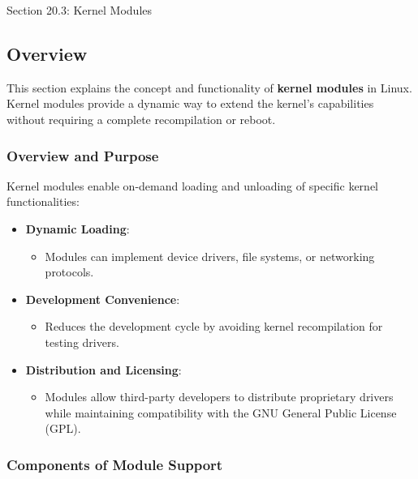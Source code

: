 \begin{notes}{Section 20.3: Kernel Modules}
    \subsection*{Overview}

    This section explains the concept and functionality of \textbf{kernel modules} in Linux. Kernel modules provide a dynamic way to extend the kernel's capabilities without requiring a complete 
    recompilation or reboot.
    
    \subsubsection*{Overview and Purpose}
    
    Kernel modules enable on-demand loading and unloading of specific kernel functionalities:
    \begin{itemize}
        \item \textbf{Dynamic Loading}:
        \begin{itemize}
            \item Modules can implement device drivers, file systems, or networking protocols.
        \end{itemize}
        \item \textbf{Development Convenience}:
        \begin{itemize}
            \item Reduces the development cycle by avoiding kernel recompilation for testing drivers.
        \end{itemize}
        \item \textbf{Distribution and Licensing}:
        \begin{itemize}
            \item Modules allow third-party developers to distribute proprietary drivers while maintaining compatibility with the GNU General Public License (GPL).
        \end{itemize}
    \end{itemize}
    
    \subsubsection*{Components of Module Support}
    

\end{notes}

